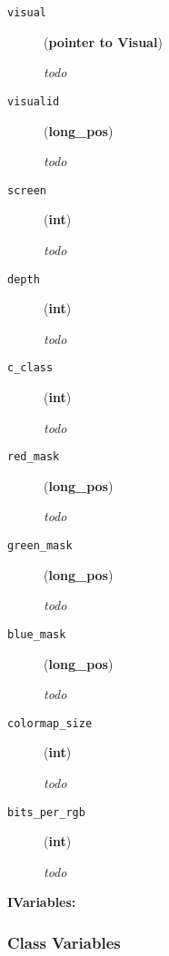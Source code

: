 %
\begin{description}
\item[{\texttt{visual}}] \leavevmode (\textbf{pointer to Visual})

\emph{todo}

\item[{\texttt{visualid}}] \leavevmode (\textbf{long\_pos})

\emph{todo}

\item[{\texttt{screen}}] \leavevmode (\textbf{int})

\emph{todo}

\item[{\texttt{depth}}] \leavevmode (\textbf{int})

\emph{todo}

\item[{\texttt{c\_class}}] \leavevmode (\textbf{int})

\emph{todo}

\item[{\texttt{red\_mask}}] \leavevmode (\textbf{long\_pos})

\emph{todo}

\item[{\texttt{green\_mask}}] \leavevmode (\textbf{long\_pos})

\emph{todo}

\item[{\texttt{blue\_mask}}] \leavevmode (\textbf{long\_pos})

\emph{todo}

\item[{\texttt{colormap\_size}}] \leavevmode (\textbf{int})

\emph{todo}

\item[{\texttt{bits\_per\_rgb}}] \leavevmode (\textbf{int})

\emph{todo}

\end{description}
\textbf{IVariables:} 



  \subsubsection{Class Variables}

